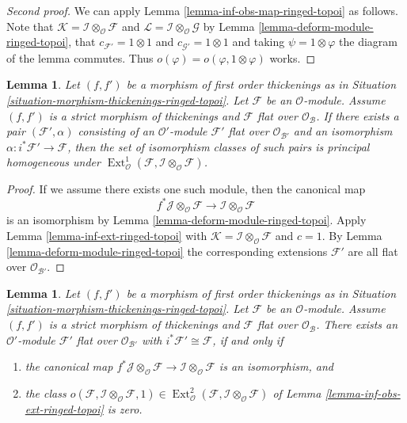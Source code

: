 \documentclass{stacks-project}
\theoremstyle{plain}
\newtheorem{lemma}[subsection]{Lemma}
\theoremstyle{definition}
\theoremstyle{remark}
\numberwithin{equation}{subsection}
\def\Ext{\mathop{\mathrm{Ext}}\nolimits}
\begin{document}
\begin{proof}[Second proof]
We can apply Lemma \ref{lemma-inf-obs-map-ringed-topoi} as follows. Note that
$\mathcal{K} = \mathcal{I} \otimes_\mathcal{O} \mathcal{F}$ and
$\mathcal{L} = \mathcal{I} \otimes_\mathcal{O} \mathcal{G}$
by Lemma \ref{lemma-deform-module-ringed-topoi}, that
$c_{\mathcal{F}'} = 1 \otimes 1$ and $c_{\mathcal{G}'} = 1 \otimes 1$
and taking $\psi = 1 \otimes \varphi$ the diagram of the lemma
commutes. Thus $o(\varphi) = o(\varphi, 1 \otimes \varphi)$
works.
\end{proof}

\begin{lemma}
\label{lemma-inf-ext-rel-ringed-topoi}
Let $(f, f')$ be a morphism of first order thickenings as in
Situation \ref{situation-morphism-thickenings-ringed-topoi}.
Let $\mathcal{F}$ be an $\mathcal{O}$-module.
Assume $(f, f')$ is a strict morphism of thickenings and
$\mathcal{F}$ flat over $\mathcal{O}_\mathcal{B}$. If there exists a pair
$(\mathcal{F}', \alpha)$ consisting of an
$\mathcal{O}'$-module $\mathcal{F}'$ flat over $\mathcal{O}_{\mathcal{B}'}$
and an isomorphism
$\alpha : i^*\mathcal{F}' \to \mathcal{F}$, then the set of
isomorphism classes of such pairs is principal homogeneous
under
$\Ext^1_\mathcal{O}(
\mathcal{F}, \mathcal{I} \otimes_\mathcal{O} \mathcal{F})$.
\end{lemma}

\begin{proof}
If we assume there exists one such module, then the canonical map
$$
f^*\mathcal{J} \otimes_\mathcal{O} \mathcal{F} \to
\mathcal{I} \otimes_\mathcal{O} \mathcal{F}
$$
is an isomorphism by Lemma \ref{lemma-deform-module-ringed-topoi}. Apply
Lemma \ref{lemma-inf-ext-ringed-topoi} with $\mathcal{K} = 
\mathcal{I} \otimes_\mathcal{O} \mathcal{F}$
and $c = 1$. By Lemma \ref{lemma-deform-module-ringed-topoi}
the corresponding extensions
$\mathcal{F}'$ are all flat over $\mathcal{O}_{\mathcal{B}'}$.
\end{proof}

\begin{lemma}
\label{lemma-inf-obs-ext-rel-ringed-topoi}
Let $(f, f')$ be a morphism of first order thickenings as in
Situation \ref{situation-morphism-thickenings-ringed-topoi}.
Let $\mathcal{F}$ be an $\mathcal{O}$-module. Assume
$(f, f')$ is a strict morphism of thickenings
and $\mathcal{F}$ flat over $\mathcal{O}_\mathcal{B}$. There exists an
$\mathcal{O}'$-module $\mathcal{F}'$ flat over $\mathcal{O}_{\mathcal{B}'}$
with $i^*\mathcal{F}' \cong \mathcal{F}$, if and only if
\begin{enumerate}
\item the canonical map
$f^*\mathcal{J} \otimes_\mathcal{O} \mathcal{F} \to
\mathcal{I} \otimes_\mathcal{O} \mathcal{F}$
is an isomorphism, and
\item the class
$o(\mathcal{F}, \mathcal{I} \otimes_\mathcal{O} \mathcal{F}, 1)
\in \Ext^2_\mathcal{O}(
\mathcal{F}, \mathcal{I} \otimes_\mathcal{O} \mathcal{F})$
of Lemma \ref{lemma-inf-obs-ext-ringed-topoi} is zero.
\end{enumerate}
\end{lemma}
\end{document}
